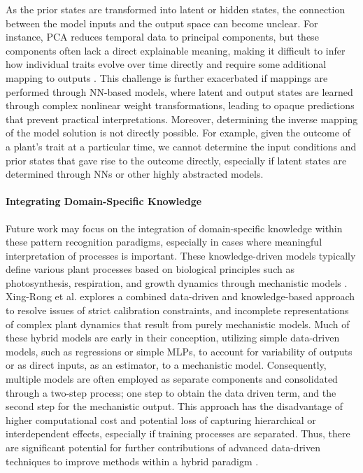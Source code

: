 \documentclass{article}
\begin{document}
As the prior states are transformed into latent or hidden states, the connection between the model inputs and the output space can become unclear. 
For instance, PCA reduces temporal data to principal components, but these components often lack a direct explainable meaning, making it difficult to infer how individual traits evolve over time directly and require some additional mapping to outputs \cite{jolliffe2016principal}. 
This challenge is further exacerbated if mappings are performed through NN-based models, where latent and output states are learned through complex nonlinear weight transformations, leading to opaque predictions that prevent practical interpretations. Moreover, determining the inverse mapping of the model solution is not directly possible. For example, given the outcome of a plant's trait at a particular time, we cannot determine the input conditions and prior states that gave rise to the outcome directly, especially if latent states are determined through NNs or other highly abstracted models.

\paragraph{Integrating Domain-Specific Knowledge}

Future work may focus on the integration of domain-specific knowledge within these pattern recognition paradigms, especially in cases where meaningful interpretation of processes is important. These knowledge-driven models typically define various plant processes based on biological principles such as photosynthesis, respiration, and growth dynamics through mechanistic models \cite{CASSIA}. Xing-Rong et al. \cite{FAN2015363} explores a combined data-driven and knowledge-based approach to resolve issues of strict calibration constraints, and incomplete representations of complex plant dynamics that result from purely mechanistic models. Much of these hybrid models are early in their conception, utilizing simple data-driven models, such as regressions or simple MLPs, to account for variability of outputs or as direct inputs, as an estimator, to a mechanistic model. Consequently, multiple models are often employed as separate components and consolidated through a two-step process; one step to obtain the data driven term, and the second step for the mechanistic output. This approach has the disadvantage of higher computational cost and potential loss of capturing hierarchical or interdependent effects, especially if training processes are separated. Thus, there are significant potential for further contributions of advanced data-driven techniques to improve methods within a hybrid paradigm \cite{shi2025deep}.
\end{document}
